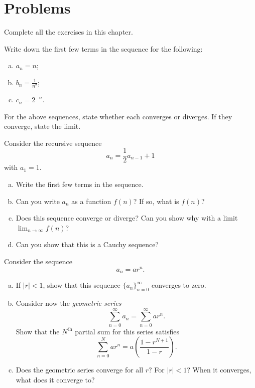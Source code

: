 \section*{Problems}

\begin{problem}
Complete all the exercises in this chapter.
\end{problem}

\begin{problem}
Write down the first few terms in the sequence for the following:
\begin{enumerate}[(a)]
    \item $a_n = n$;
    \item $b_n = \frac{1}{n^2}$;
    \item $c_n = 2^{-n}$.
\end{enumerate}
\end{problem}

\begin{problem}
For the above sequences, state whether each converges or diverges.  If they converge, state the limit.
\end{problem}

\begin{problem}
Consider the recursive sequence
\[
a_n = \frac{1}{2} a_{n-1} + 1
\]
with $a_1 = 1$.
\begin{enumerate}[(a)]
    \item Write the first few terms in the sequence.
    \item Can you write $a_n$ as a function $f(n)$? If so, what is $f(n)$?
    \item Does this sequence converge or diverge? Can you show why with a limit $\lim_{n\to \infty} f(n)$?
    \item Can you show that this is a Cauchy sequence?
\end{enumerate}
\end{problem}

\begin{problem}
Consider the sequence
\[
a_n = a r^n.
\]
\begin{enumerate}[(a)]
    \item If $|r|<1$, show that this sequence $\{a_n\}_{n=0}^\infty$ converges to zero.
    \item Consider now the \emph{geometric series}
    \[
    \sum_{n=0}^\infty a_n = \sum_{n=0}^\infty ar^n.
    \]
    Show that the $N^\textrm{th}$ partial sum for this series satisfies
    \[
    \sum_{n=0}^N ar^n = a\left( \frac{1-r^{N+1}}{1-r}\right).
    \]
    \item Does the geometric series converge for all $r$? For $|r|<1$? When it converges, what does it converge to?
\end{enumerate}
\end{problem}

